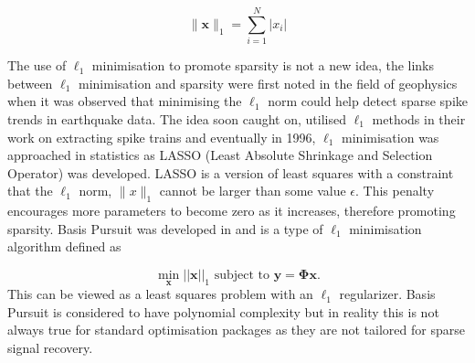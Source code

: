 \begin{equation}
\label{eq:57}
  \|\boldsymbol{x}\|_1 = \sum_{i=1}^{N}|x_i|
\end{equation}

The use of $\ell_1$ minimisation to promote sparsity is not a new idea, the links between $\ell_1$ minimisation and sparsity were first noted in the field of geophysics when it was observed \cite{claerbout1973} that minimising the $\ell_1$ norm could help detect sparse spike trends in earthquake data. The idea soon caught on, \cite{taylor1979} utilised $\ell_1$ methods in their work on extracting spike trains and eventually in 1996, $\ell_1$ minimisation was approached in statistics as LASSO \cite{tibshirani1996} (Least Absolute Shrinkage and Selection Operator) was developed. LASSO is a version of least squares with a constraint that the $\ell_1$ norm, $\|x\|_1$ cannot be larger than some value $\epsilon$. This penalty encourages more parameters to become zero as it increases, therefore promoting sparsity. Basis Pursuit was developed in \cite{chen2001} and is a type of $\ell_1$ minimisation algorithm defined as 

\begin{equation}
  \label{eq:4}
  \min_{\boldsymbol{x}} ||\boldsymbol{x}||_1 \text{ subject to } \boldsymbol{y} = \boldsymbol{\Phi} \boldsymbol{x}.
\end{equation}
This can be viewed as a least squares problem with an $\ell_1$ regularizer. Basis Pursuit is considered to have polynomial complexity but in reality this is not always true for standard optimisation packages as they are not tailored for sparse signal recovery. 


